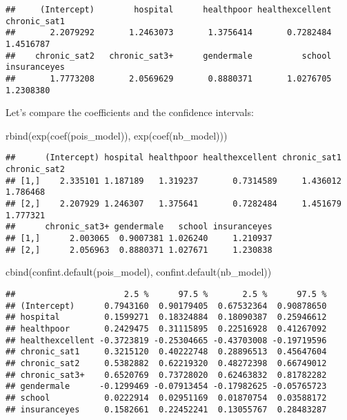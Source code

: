 \documentclass[
  oneside]{book}
\newenvironment{Shaded}{\begin{snugshade}}{\end{snugshade}}
\newcommand{\FunctionTok}[1]{\textcolor[rgb]{0.00,0.00,0.00}{#1}}
\newcommand{\NormalTok}[1]{#1}
\begin{document}
\begin{verbatim}
##     (Intercept)        hospital      healthpoor healthexcellent    chronic_sat1 
##       2.2079292       1.2463073       1.3756414       0.7282484       1.4516787 
##    chronic_sat2   chronic_sat3+      gendermale          school    insuranceyes 
##       1.7773208       2.0569629       0.8880371       1.0276705       1.2308380
\end{verbatim}

Let's compare the coefficients and the confidence intervals:

\begin{Shaded}
\begin{Highlighting}[]
\FunctionTok{rbind}\NormalTok{(}\FunctionTok{exp}\NormalTok{(}\FunctionTok{coef}\NormalTok{(pois\_model)), }\FunctionTok{exp}\NormalTok{(}\FunctionTok{coef}\NormalTok{(nb\_model)))}
\end{Highlighting}
\end{Shaded}

\begin{verbatim}
##      (Intercept) hospital healthpoor healthexcellent chronic_sat1 chronic_sat2
## [1,]    2.335101 1.187189   1.319237       0.7314589     1.436012     1.786468
## [2,]    2.207929 1.246307   1.375641       0.7282484     1.451679     1.777321
##      chronic_sat3+ gendermale   school insuranceyes
## [1,]      2.003065  0.9007381 1.026240     1.210937
## [2,]      2.056963  0.8880371 1.027671     1.230838
\end{verbatim}

\begin{Shaded}
\begin{Highlighting}[]
\FunctionTok{cbind}\NormalTok{(}\FunctionTok{confint.default}\NormalTok{(pois\_model), }\FunctionTok{confint.default}\NormalTok{(nb\_model))}
\end{Highlighting}
\end{Shaded}

\begin{verbatim}
##                      2.5 %      97.5 %       2.5 %      97.5 %
## (Intercept)      0.7943160  0.90179405  0.67532364  0.90878650
## hospital         0.1599271  0.18324884  0.18090387  0.25946612
## healthpoor       0.2429475  0.31115895  0.22516928  0.41267092
## healthexcellent -0.3723819 -0.25304665 -0.43703008 -0.19719596
## chronic_sat1     0.3215120  0.40222748  0.28896513  0.45647604
## chronic_sat2     0.5382882  0.62219320  0.48272398  0.66749012
## chronic_sat3+    0.6520769  0.73728020  0.62463832  0.81782282
## gendermale      -0.1299469 -0.07913454 -0.17982625 -0.05765723
## school           0.0222914  0.02951169  0.01870754  0.03588172
## insuranceyes     0.1582661  0.22452241  0.13055767  0.28483287
\end{verbatim}
\end{document}
